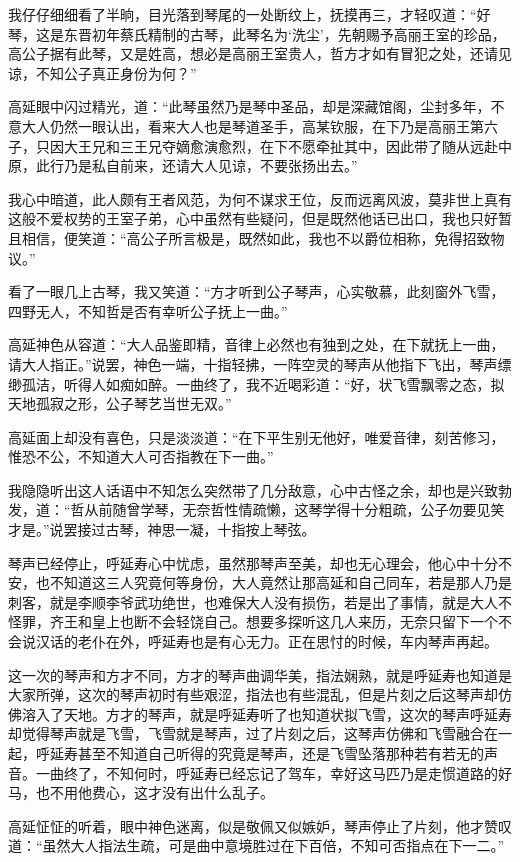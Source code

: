 我仔仔细细看了半晌，目光落到琴尾的一处断纹上，抚摸再三，才轻叹道：“好琴，这是东晋初年蔡氏精制的古琴，此琴名为‘洗尘’，先朝赐予高丽王室的珍品，高公子据有此琴，又是姓高，想必是高丽王室贵人，哲方才如有冒犯之处，还请见谅，不知公子真正身份为何？”

高延眼中闪过精光，道：“此琴虽然乃是琴中圣品，却是深藏馆阁，尘封多年，不意大人仍然一眼认出，看来大人也是琴道圣手，高某钦服，在下乃是高丽王第六子，只因大王兄和三王兄夺嫡愈演愈烈，在下不愿牵扯其中，因此带了随从远赴中原，此行乃是私自前来，还请大人见谅，不要张扬出去。”

我心中暗道，此人颇有王者风范，为何不谋求王位，反而远离风波，莫非世上真有这般不爱权势的王室子弟，心中虽然有些疑问，但是既然他话已出口，我也只好暂且相信，便笑道：“高公子所言极是，既然如此，我也不以爵位相称，免得招致物议。”

看了一眼几上古琴，我又笑道：“方才听到公子琴声，心实敬慕，此刻窗外飞雪，四野无人，不知哲是否有幸听公子抚上一曲。”

高延神色从容道：“大人品鉴即精，音律上必然也有独到之处，在下就抚上一曲，请大人指正。”说罢，神色一端，十指轻拂，一阵空灵的琴声从他指下飞出，琴声缥缈孤洁，听得人如痴如醉。一曲终了，我不近喝彩道：“好，状飞雪飘零之态，拟天地孤寂之形，公子琴艺当世无双。”

高延面上却没有喜色，只是淡淡道：“在下平生别无他好，唯爱音律，刻苦修习，惟恐不公，不知道大人可否指教在下一曲。”

我隐隐听出这人话语中不知怎么突然带了几分敌意，心中古怪之余，却也是兴致勃发，道：“哲从前随曾学琴，无奈哲性情疏懒，这琴学得十分粗疏，公子勿要见笑才是。”说罢接过古琴，神思一凝，十指按上琴弦。

琴声已经停止，呼延寿心中忧虑，虽然那琴声至美，却也无心理会，他心中十分不安，也不知道这三人究竟何等身份，大人竟然让那高延和自己同车，若是那人乃是刺客，就是李顺李爷武功绝世，也难保大人没有损伤，若是出了事情，就是大人不怪罪，齐王和皇上也断不会轻饶自己。想要多探听这几人来历，无奈只留下一个不会说汉话的老仆在外，呼延寿也是有心无力。正在思忖的时候，车内琴声再起。

这一次的琴声和方才不同，方才的琴声曲调华美，指法娴熟，就是呼延寿也知道是大家所弹，这次的琴声初时有些艰涩，指法也有些混乱，但是片刻之后这琴声却仿佛溶入了天地。方才的琴声，就是呼延寿听了也知道状拟飞雪，这次的琴声呼延寿却觉得琴声就是飞雪，飞雪就是琴声，过了片刻之后，这琴声仿佛和飞雪融合在一起，呼延寿甚至不知道自己听得的究竟是琴声，还是飞雪坠落那种若有若无的声音。一曲终了，不知何时，呼延寿已经忘记了驾车，幸好这马匹乃是走惯道路的好马，也不用他费心，这才没有出什么乱子。

高延怔怔的听着，眼中神色迷离，似是敬佩又似嫉妒，琴声停止了片刻，他才赞叹道：“虽然大人指法生疏，可是曲中意境胜过在下百倍，不知可否指点在下一二。”

